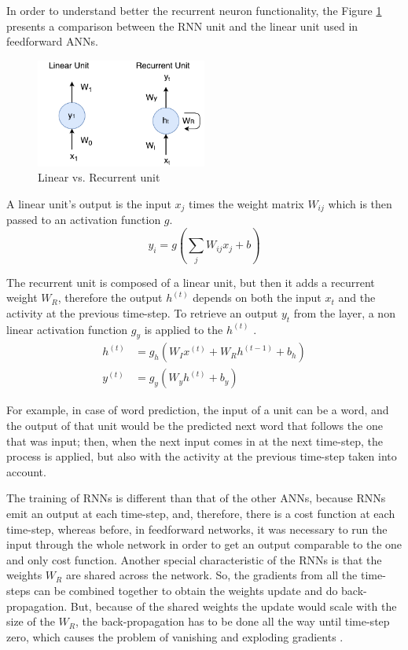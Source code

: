 In order to understand better the recurrent neuron functionality, the Figure \ref{Units} presents a comparison between the RNN unit and the linear unit used in feedforward ANNs.

\begin{figure}[H]
	\centering
	\includegraphics[width=0.5\textwidth]{Figures/RecurrentUnit}
	\caption{Linear vs. Recurrent unit}
	\label{Units}
\end{figure}
A linear unit's output is the input $x_{j}$ times the weight matrix $W_{ij}$ which is then passed to an activation function $g$.
\begin{equation}\label{linearOutput}
y_{i}=g(\sum_{j}W_{ij}x_{j}+b)
\end{equation}

The recurrent unit is composed of a linear unit, but then it adds a recurrent weight $W_{R}$, therefore the output $h^{(t)}$ depends on both the input $x_{t}$ and the activity at the previous time-step. To retrieve an output $y_{t}$ from the layer, a non linear activation function $g_{y}$ is applied to the $h^{(t)}$ \cite{NeonRNN}.
\begin{equation}\label{recurrentOutput}
\begin{aligned}
h^{(t)}&=g_{h}(W_{I}x^{(t)}+W_{R}h^{(t-1)}+b_{h})\\
y^{(t)}&=g_{y}(W_{y}h^{(t)}+b_{y})
\end{aligned}
\end{equation}

For example, in case of word prediction, the input of a unit can be a word, and the output of that unit would be the predicted next word that follows the one that was input; then, when the next input comes in at the next time-step, the process is applied, but also with the activity at the previous time-step taken into account.

The training of RNNs is different than that of the other ANNs, because RNNs emit an output at each time-step, and, therefore, there is a cost function at each time-step, whereas before, in feedforward networks, it was necessary to run the input through the whole network in order to get an output comparable to the one and only cost function. Another special characteristic of the RNNs is that the weights $W_{R}$ are shared across the network. So, the gradients from all the time-steps can be combined together to obtain the weights update and do back-propagation. But, because of the shared weights the update would scale with the size of the $W_{R}$, the back-propagation has to be done all the way until time-step zero, which causes the problem of vanishing and exploding gradients \cite{NeonRNN}.

